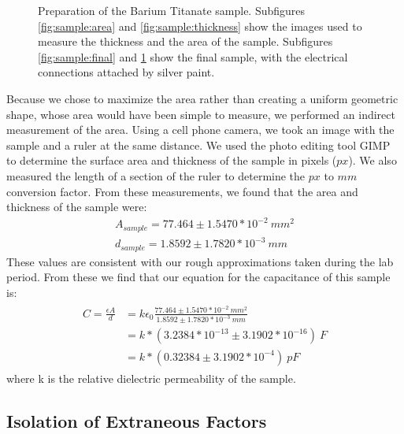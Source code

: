 \documentclass[%
 reprint,
 amsmath,amssymb,
 aps,
 pra,
]{revtex4-1}
\begin{document}
\begin{figure}[H]
\begin{subfigure}{0.22\textwidth}
		\caption{}
		\label{fig:sample:inplace}
	\end{subfigure}
	\caption{Preparation of the Barium Titanate sample. Subfigures \ref{fig:sample:area} and \ref{fig:sample:thickness} show the images used to measure the thickness and the area of the sample. Subfigures \ref{fig:sample:final} and \ref{fig:sample:inplace} show the final sample, with the electrical connections attached by silver paint.}
	\label{fig:sample}
\end{figure}

Because we chose to maximize the area rather than creating a uniform geometric shape, whose area would have been simple to measure, we performed an indirect measurement of the area. Using a cell phone camera, we took an image with the sample and a ruler at the same distance. We used the photo editing tool GIMP to determine the surface area and thickness of the sample in pixels ($px$). We also measured the length of a section of the ruler to determine the $px$ to $mm$ conversion factor. From these measurements, we found that the area and thickness of the sample were:
\begin{gather}
	A_{sample} = 77.464 \pm 1.5470*10^{-2} ~mm^2  \nonumber \\
	d_{sample} = 1.8592 \pm 1.7820*10^{-3} ~mm	 \nonumber
\end{gather}
These values are consistent with our rough approximations taken during the lab period. From these we find that our equation for the capacitance of this sample is:
\begin{gather}
	\begin{align}
		C = \frac{\epsilon A}{d} & = k \epsilon_0 \frac{77.464 \pm 1.5470*10^{-2} ~mm^2}{1.8592 \pm 1.7820*10^{-3} ~mm} \nonumber \\
		& = k*(3.2384*10^{-13} \pm 3.1902*10^{-16})~F \nonumber \\
		& = k*(0.32384 \pm 3.1902*10^{-4})~pF \nonumber
	\end{align}
\end{gather}
where k is the relative dielectric permeability of the sample. 

\subsection{Isolation of Extraneous Factors}
\end{document}
